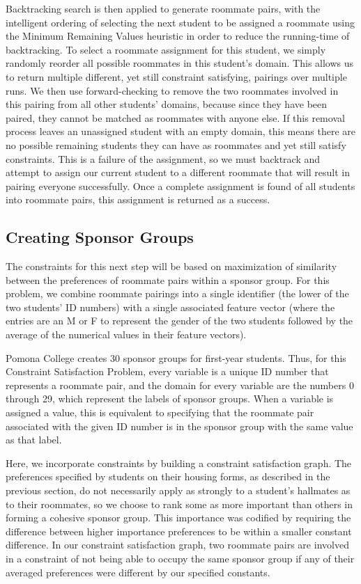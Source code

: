 \documentclass[letterpaper]{article}
\begin{document}
Backtracking search is then applied to generate roommate pairs, with the intelligent ordering of selecting the next student to be assigned a roommate using the Minimum Remaining Values heuristic in order to reduce the running-time of backtracking. To select a roommate assignment for this student, we simply randomly reorder all possible roommates in this student's domain. This allows us to return multiple different, yet still constraint satisfying, pairings over multiple runs. We then use forward-checking to remove the two roommates involved in this pairing from all other students' domains, because since they have been paired, they cannot be matched as roommates with anyone else. If this removal process leaves an unassigned student with an empty domain, this means there are no possible remaining students they can have as roommates and yet still satisfy constraints. This is a failure of the assignment, so we must backtrack and attempt to assign our current student to a different roommate that will result in pairing everyone successfully. Once a complete assignment is found of all students into roommate pairs, this assignment is returned as a success.

\subsection{Creating Sponsor Groups}

The constraints for this next step will be based on maximization of similarity between the preferences of roommate pairs within a sponsor group. For this problem, we combine roommate pairings into a single identifier (the lower of the two students' ID numbers) with a single associated feature vector (where the entries are an M or F to represent the gender of the two students followed by the average of the numerical values in their feature vectors). 

Pomona College creates 30 sponsor groups for first-year students. Thus, for this Constraint Satisfaction Problem, every variable is a unique ID number that represents a roommate pair, and the domain for every variable are the numbers 0 through 29, which represent the labels of sponsor groups. When a variable is assigned a value, this is equivalent to specifying that the roommate pair associated with the given ID number is in the sponsor group with the same value as that label. 

Here, we incorporate constraints by building a constraint satisfaction graph. The preferences specified by students on their housing forms, as described in the previous section, do not necessarily apply as strongly to a student's hallmates as to their roommates, so we choose to rank some as more important than others in forming a cohesive sponsor group. This importance was codified by requiring the difference between higher importance preferences to be within a smaller constant difference. In our constraint satisfaction graph, two roommate pairs are involved in a constraint of not being able to occupy the same sponsor group if any of their averaged preferences were different by our specified constants. 
\end{document}
